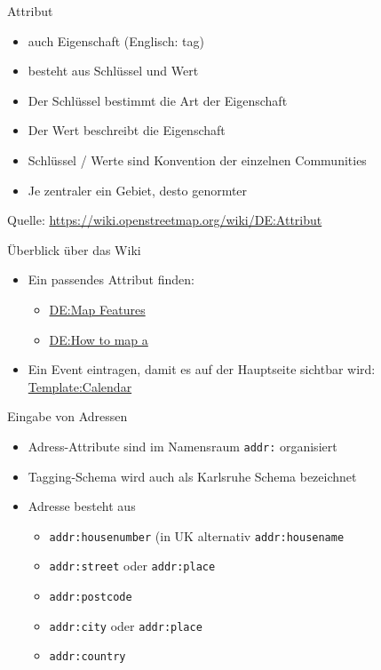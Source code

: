 \documentclass{beamer}
\begin{document}
\begin{frame}{Attribut}
\begin{itemize}
  \item auch Eigenschaft (Englisch: tag)
  \item besteht aus Schlüssel und Wert
  \item Der Schlüssel bestimmt die Art der Eigenschaft
  \item Der Wert beschreibt die Eigenschaft
  \item Schlüssel / Werte sind Konvention der einzelnen Communities
  \item Je zentraler ein Gebiet, desto genormter
\end{itemize}
Quelle: \url{https://wiki.openstreetmap.org/wiki/DE:Attribut}
\end{frame}

\begin{frame}{Überblick über das Wiki}
\begin{itemize}
  \item Ein passendes Attribut finden:
  \begin{itemize}
    \item \href{https://wiki.openstreetmap.org/wiki/DE:Map_Features}{DE:Map Features}
    \item \href{https://wiki.openstreetmap.org/wiki/DE:How_to_map_a}{DE:How to map a}
  \end{itemize}
  \item Ein Event eintragen, damit es auf der Hauptseite sichtbar wird: \href{https://wiki.openstreetmap.org/wiki/Template:Calendar}{Template:Calendar}
\end{itemize}
\end{frame}

\begin{frame}{Eingabe von Adressen}
\begin{itemize}
  \item Adress-Attribute sind im Namensraum \texttt{addr:} organisiert
  \item Tagging-Schema wird auch als Karlsruhe Schema bezeichnet
  \item Adresse besteht aus
  \begin{itemize}
    \item \texttt{addr:housenumber} (in UK alternativ \texttt{addr:housename}
    \item \texttt{addr:street} oder \texttt{addr:place}
    \item \texttt{addr:postcode}
    \item \texttt{addr:city} oder \texttt{addr:place}
    \item \texttt{addr:country}
  \end{itemize}
\end{itemize}
\end{frame}
\end{document}
